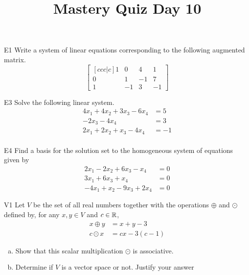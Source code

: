 \documentclass{sbgLAquiz}
\title{Mastery Quiz Day 10 }
\begin{document}
\begin{problem}{E1}
Write a system of linear equations corresponding to the following
augmented matrix.
\[
\begin{bmatrix}[ccc|c]
1 & 0 & 4 & 1 \\
0 & 1 & -1 & 7 \\
1 & -1 & 3 & -1
\end{bmatrix}
\]
\end{problem}

\begin{problem}{E3}
Solve the following linear system.
\begin{align*}
4x_1+4x_2+3x_3-6x_4 &= 5 \\
-2x_3-4x_4 &= 3 \\
2x_1+2x_2+x_3-4x_4 &= -1 \\
\end{align*}
\end{problem}
\newpage

\begin{problem}{E4}
Find a basis for the solution set to the homogeneous system of equations
given by
\begin{align*}
2x_1-2x_2+6x_3-x_4 &=0 \\
3x_1+6x_3+x_4 &=0 \\
-4x_1+x_2-9x_3+2x_4&=0
\end{align*}
\end{problem}

\begin{problem}{V1}
Let $V$ be the  set of all real numbers together with the operations $\oplus$ and $\odot$ defined by, for any $x,y \in V$ and $c \in \mathbb{R}$,
\begin{align*}
x\oplus y  &= x+y-3 \\
c \odot x &= cx-3(c-1)
\end{align*}
\begin{enumerate}[(a)]
\item Show that this scalar multiplication $\odot$ is associative.
\item Determine if $V$ is a vector space or not.  Justify your answer
\end{enumerate}
\end{problem}
\end{document}
